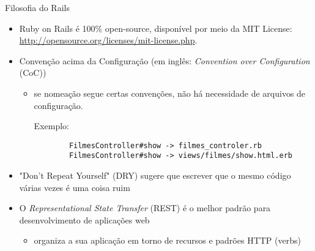 \begin{frame}{Filosofia do Rails}
  \begin{itemize}
    \item Ruby on Rails é 100\% open-source, disponível por meio da MIT License:
      \url{http://opensource.org/licenses/mit-license.php}.  
 
    \item \alert{Convenção} acima da Configuração (em inglês: \textit{Convention over Configuration} (CoC))
    \begin{itemize}
	\item se nomeação segue certas convenções, não há necessidade de arquivos de configuração.
	\begin{exampleblock}{Exemplo:}
	  \begin{verbatim}
	    FilmesController#show -> filmes_controler.rb 
	    FilmesController#show -> views/filmes/show.html.erb
	  \end{verbatim}
	\end{exampleblock}
    \end{itemize}
  
    \item \alert{"Don't Repeat Yourself"} (DRY) sugere que escrever que o mesmo código várias 
      vezes é uma coisa ruim
    
    \item O \textit{Representational State Transfer} (REST) é o melhor padrão para desenvolvimento de aplicações web
    \begin{itemize}
     \item organiza a sua aplicação em torno de \alert{recursos} e \alert{padrões} HTTP (verbs)
    \end{itemize}

  \end{itemize}   
\end{frame}

